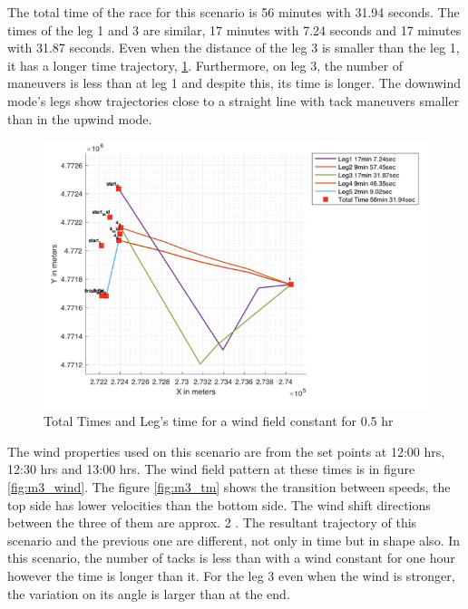The total time of the race for this scenario is 56 minutes with 31.94 seconds. The times of the leg 1 and 3 are similar, 17 minutes with 7.24 seconds and 17 minutes with 31.87 seconds. Even when the distance of the leg 3 is smaller than the leg 1, it has a longer time trajectory, \ref{fig:times_windm3}. Furthermore, on leg 3, the number of maneuvers is less than at leg 1 and despite this, its time is longer. The downwind mode's legs show  trajectories close to a straight line with tack maneuvers smaller than in the upwind mode. \par  
\begin{figure} [hbt!]
    \centering
    \includegraphics[width=0.75 \linewidth]{images/m3_times.png}
    \caption{Total Times and Leg's time for a wind field constant for 0.5 hr}
    \label{fig:times_windm3}
\end{figure}

The wind properties used on this scenario are from the set points at 12:00 hrs, 12:30 hrs and 13:00 hrs. The wind field pattern at these times is in figure \ref{fig:m3_wind}. The figure \ref{fig:m3_tm} shows the transition between speeds, the top side has lower velocities than the bottom side. The wind shift directions between the three of them are approx. 2 \degree. The resultant trajectory of this scenario and the previous one are  different, not only in time but in shape also. In this scenario, the number of tacks is less than with a wind constant for one hour however the time is longer than it. For the leg 3 even when the wind is stronger, the variation on its angle is larger than at the end.  \par    

